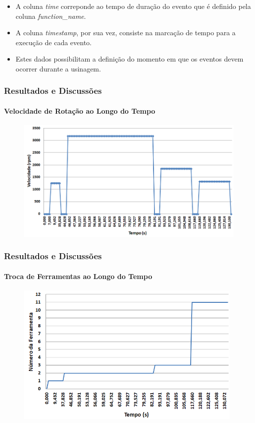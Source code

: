 \documentclass[aspectratio=169]{beamer}
\begin{document}
{\begin{frame}[fragile]
  \begin{itemize}
    \item A coluna \emph{time} correponde ao tempo de duração do evento 
    que é definido pela coluna \emph{function\_name}.
    \item A coluna \emph{timestamp}, por sua vez, consiste na 
    marcação de tempo para a execução de cada evento.
    \item Estes dados possibilitam a definição do momento em que os 
          eventos devem ocorrer durante a usinagem.
  \end{itemize}

\end{frame}


\begin{frame}[fragile]
  \frametitle{Resultados e Discussões}
  \framesubtitle{Velocidade de Rotação ao Longo do Tempo}

  \begin{figure}[H]
    \centering
    \includegraphics[width=120mm]{images/spindle-speed-values-graph.png}
  \end{figure}

\end{frame}


\begin{frame}[fragile]
  \frametitle{Resultados e Discussões}
  \framesubtitle{Troca de Ferramentas ao Longo do Tempo}

  \begin{figure}[H]
    \centering
    \includegraphics[width=110mm]{images/tool-number-values-graph.png}
  \end{figure}


\end{frame}}
\end{document}
